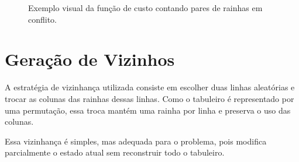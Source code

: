 \documentclass[12pt,a4paper]{article}
\newcommand{\desenharTabuleiro}{
    \foreach \linha in {0,...,3} {
        \foreach \coluna in {0,...,3} {
            \pgfmathtruncatemacro{\cor}{mod(\linha+\coluna,2)}
            \ifnum\cor=0
                \fill[casaClara] (\coluna,-\linha) rectangle ++(1,-1);
            \else
                \fill[casaEscura] (\coluna,-\linha) rectangle ++(1,-1);
            \fi
        }
    }
    \draw[texto, line width=0.7pt] (0,0) rectangle (4,-4);
    \foreach \i in {1,2,3} {
        \draw[black!20] (\i,0) -- (\i,-4);
        \draw[black!20] (0,-\i) -- (4,-\i);
    }
}
\newcommand{\rainha}[2]{
    \node[rainha] at ({#2+0.5},{-#1-0.5}) {Q};
}
\begin{document}
\begin{figure}[H]
\centering
{}
\caption{Exemplo visual da função de custo contando pares de rainhas em conflito.}
\end{figure}

\section{Geração de Vizinhos}

A estratégia de vizinhança utilizada consiste em escolher duas linhas aleatórias e trocar as colunas das rainhas dessas linhas. Como o tabuleiro é representado por uma permutação, essa troca mantém uma rainha por linha e preserva o uso das colunas.

Essa vizinhança é simples, mas adequada para o problema, pois modifica parcialmente o estado atual sem reconstruir todo o tabuleiro.
\end{document}
